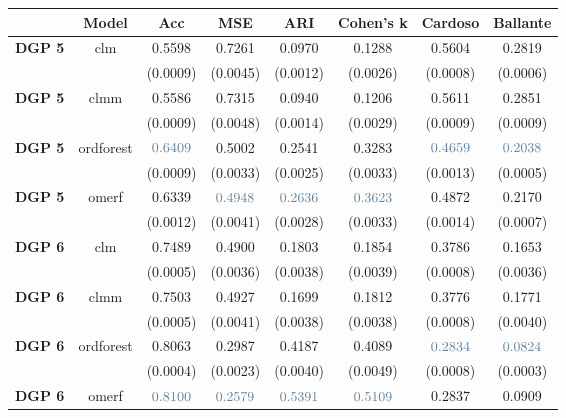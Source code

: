 \begin{table}[H]
    \centering 
    \begin{tabular}{|p{4em} c c c c c c c |}
    \hline
    \rowcolor{bluePoli!40}
    & \textbf{Model} & \textbf{Acc} & \textbf{MSE} & \textbf{ARI} & \textbf{Cohen's k} & \textbf{Cardoso} & \textbf{Ballante} \T\B \\
    \hline \hline
    \textbf{DGP 5} & clm & 0.5598 & 0.7261 & 0.0970 & 0.1288 & 0.5604 & 0.2819 \T\B \\
    \textbf{} &  & (0.0009) & (0.0045) & (0.0012)  & (0.0026)  & (0.0008)  & (0.0006) \T\B \\
    \textbf{DGP 5} & clmm & 0.5586 & 0.7315 & 0.0940 & 0.1206 & 0.5611 & 0.2851 \T\B \\
    \textbf{} &  & (0.0009) & (0.0048) & (0.0014)  & (0.0029)  & (0.0009)  & (0.0009) \T\B \\
    \textbf{DGP 5} & ordforest & $\textcolor{bluePoli}{0.6409}$ & 0.5002 & 0.2541 & 0.3283 & $\textcolor{bluePoli}{0.4659}$ & $\textcolor{bluePoli}{0.2038}$ \T\B \\
    \textbf{} &  & (0.0009) & (0.0033) & (0.0025)  & (0.0033)  & (0.0013)  & (0.0005) \T\B \\
    \textbf{DGP 5} & omerf & 0.6339 & $\textcolor{bluePoli}{0.4948}$ & $\textcolor{bluePoli}{0.2636}$ & $\textcolor{bluePoli}{0.3623}$ & 0.4872 & 0.2170 \T\B \\
    \textbf{} &  & (0.0012) & (0.0041) & (0.0028)  & (0.0033)  & (0.0014)  & (0.0007) \T\B \\
    \hline
    \textbf{DGP 6} & clm & 0.7489 & 0.4900 & 0.1803 & 0.1854 & 0.3786 & 0.1653 \T\B \\
    \textbf{} &  & (0.0005) & (0.0036) & (0.0038)  & (0.0039)  & (0.0008)  & (0.0036) \T\B \\
    \textbf{DGP 6} & clmm & 0.7503 & 0.4927 & 0.1699 & 0.1812 & 0.3776 & 0.1771 \T\B \\
    \textbf{} &  & (0.0005) & (0.0041) & (0.0038)  & (0.0038)  & (0.0008)  & (0.0040) \T\B \\
    \textbf{DGP 6} & ordforest & 0.8063 & 0.2987 & 0.4187 & 0.4089 & $\textcolor{bluePoli}{0.2834}$ & $\textcolor{bluePoli}{0.0824}$ \T\B \\
    \textbf{} &  & (0.0004) & (0.0023) & (0.0040)  & (0.0049)  & (0.0008)  & (0.0003) \T\B \\
    \textbf{DGP 6} & omerf & $\textcolor{bluePoli}{0.8100}$ & $\textcolor{bluePoli}{0.2579}$ & $\textcolor{bluePoli}{0.5391}$ & $\textcolor{bluePoli}{0.5109}$ & 0.2837 & 0.0909 \T\B \\

\end{tabular}
\end{table}
